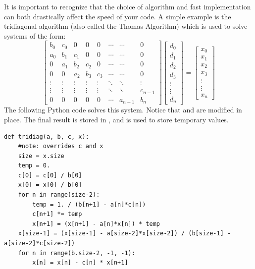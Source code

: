 It is important to recognize that the choice of algorithm and fast implementation can both drastically affect the speed of your code.
A simple example is the tridiagonal algorithm (also called the Thomas Algorithm) which is used to solve systems of the form:
\[
\begin{bmatrix}
b_0 & c_0 & 0 & 0 & 0 & \cdots & \cdots & 0 \\
a_0 & b_1 & c_1 & 0 & 0 & \cdots & \cdots & 0 \\
0 & a_1 & b_2 & c_2 & 0 & \cdots & \cdots & 0 \\
0 & 0 & a_2 & b_3 & c_3 & \cdots & \cdots & 0 \\
\vdots & \vdots & \vdots & \vdots & \vdots & \ddots & \ddots & \vdots \\
\vdots & \vdots & \vdots & \vdots & \vdots & \ddots & \ddots & c_{n-1} \\
0 & 0 & 0 & 0 & 0 & \cdots & a_{n-1} & b_n 
\end{bmatrix}
\begin{bmatrix}
d_0\\
d_1\\
d_2\\
d_3\\
\vdots\\
\vdots\\
d_n
\end{bmatrix}
=
\begin{bmatrix}
x_0\\
x_1\\
x_2\\
x_3\\
\vdots\\
\vdots\\
x_n
\end{bmatrix}
\]
The following Python code solves this system.
Notice that  and  are modified in place.
The final result is stored in , and  is used to store temporary values.
\begin{lstlisting}
def tridiag(a, b, c, x):
    #note: overrides c and x
    size = x.size
    temp = 0.
    c[0] = c[0] / b[0]
    x[0] = x[0] / b[0]
    for n in range(size-2):
        temp = 1. / (b[n+1] - a[n]*c[n])
        c[n+1] *= temp
        x[n+1] = (x[n+1] - a[n]*x[n]) * temp
    x[size-1] = (x[size-1] - a[size-2]*x[size-2]) / (b[size-1] - a[size-2]*c[size-2])
    for n in range(b.size-2, -1, -1):
        x[n] = x[n] - c[n] * x[n+1]
\end{lstlisting}

